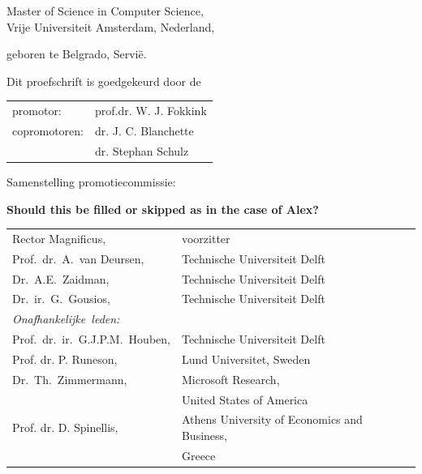 \begin{titlepage}
\begin{center}
\bigskip
\bigskip

Master of Science in Computer Science, \\
Vrije Universiteit Amsterdam, Nederland,

geboren te Belgrado, Servi\"e.

\vspace*{2\bigskipamount}

\end{center}

\clearpage
\thispagestyle{empty}

\noindent Dit proefschrift is goedgekeurd door de

\medskip\noindent
\begin{tabular}{ll}
    promotor: & prof.dr. W. J. Fokkink \\
    copromotoren: & dr. J. C. Blanchette \\
                  & dr. Stephan Schulz
\end{tabular}

\bigskip
\noindent Samenstelling promotiecommissie:

\textbf{Should this be filled or skipped as in the case of Alex?}

\medskip\noindent
\begin{tabular}{p{4.5cm}l}
    Rector Magnificus, & voorzitter \\
    Prof.\ dr.\ A.\ van Deursen, & Technische Universiteit Delft \\
    Dr.\ A.E.\ Zaidman, & Technische Universiteit Delft \\
    Dr.\ ir.\ G.\ Gousios, & Technische Universiteit Delft \\

    \medskip
    \mbox{\emph{Onafhankelijke leden:}} & \\
    Prof.\ dr.\ ir.\ G.J.P.M.\ Houben, & Technische Universiteit Delft \\
    Prof. dr. P. Runeson, & Lund Universitet, Sweden \\
    Dr.\ Th.\ Zimmermann, & Microsoft Research, \\ &United States of America \\
    Prof. dr. D. Spinellis, & Athens University of Economics and Business, \\&
    Greece \\
    

\end{tabular}
\end{titlepage}
